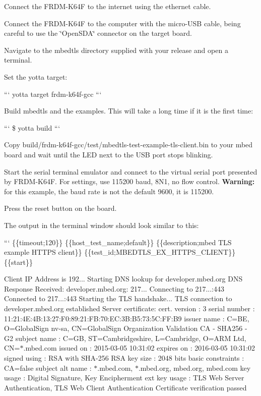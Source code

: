 \begin{DoxyEnumerate}
\item Connect the F\-R\-D\-M-\/\-K64\-F to the internet using the ethernet cable.
\item Connect the F\-R\-D\-M-\/\-K64\-F to the computer with the micro-\/\-U\-S\-B cable, being careful to use the \char`\"{}\-Open\-S\-D\-A\char`\"{} connector on the target board.
\item Navigate to the mbedtls directory supplied with your release and open a terminal.
\item Set the yotta target\-:

``` yotta target frdm-\/k64f-\/gcc ```
\item Build mbedtls and the examples. This will take a long time if it is the first time\-:

``` \$ yotta build ```
\item Copy {\ttfamily build/frdm-\/k64f-\/gcc/test/mbedtls-\/test-\/example-\/tls-\/client.\-bin} to your mbed board and wait until the L\-E\-D next to the U\-S\-B port stops blinking.
\item Start the serial terminal emulator and connect to the virtual serial port presented by F\-R\-D\-M-\/\-K64\-F. For settings, use 115200 baud, 8\-N1, no flow control. {\bfseries Warning\-:} for this example, the baud rate is not the default 9600, it is 115200.
\item Press the reset button on the board.
\item The output in the terminal window should look similar to this\-:

``` \{\{timeout;120\}\} \{\{host\-\_\-test\-\_\-name;default\}\} \{\{description;mbed T\-L\-S example H\-T\-T\-P\-S client\}\} \{\{test\-\_\-id;M\-B\-E\-D\-T\-L\-S\-\_\-\-E\-X\-\_\-\-H\-T\-T\-P\-S\-\_\-\-C\-L\-I\-E\-N\-T\}\} \{\{start\}\}

Client I\-P Address is 192... Starting D\-N\-S lookup for developer.\-mbed.\-org D\-N\-S Response Received\-: developer.\-mbed.\-org\-: 217... Connecting to 217...\-:443 Connected to 217...\-:443 Starting the T\-L\-S handshake... T\-L\-S connection to developer.\-mbed.\-org established Server certificate\-: cert. version \-: 3 serial number \-: 11\-:21\-:4\-E\-:4\-B\-:13\-:27\-:F0\-:89\-:21\-:F\-B\-:70\-:E\-C\-:3\-B\-:B5\-:73\-:5\-C\-:F\-F\-:B9 issuer name \-: C=B\-E, O=Global\-Sign nv-\/sa, C\-N=Global\-Sign Organization Validation C\-A -\/ S\-H\-A256 -\/ G2 subject name \-: C=G\-B, S\-T=Cambridgeshire, L=Cambridge, O=A\-R\-M Ltd, C\-N=$\ast$.mbed.\-com issued on \-: 2015-\/03-\/05 10\-:31\-:02 expires on \-: 2016-\/03-\/05 10\-:31\-:02 signed using \-: R\-S\-A with S\-H\-A-\/256 R\-S\-A key size \-: 2048 bits basic constraints \-: C\-A=false subject alt name \-: $\ast$.mbed.\-com, $\ast$.mbed.\-org, mbed.\-org, mbed.\-com key usage \-: Digital Signature, Key Encipherment ext key usage \-: T\-L\-S Web Server Authentication, T\-L\-S Web Client Authentication Certificate verification passed


\end{DoxyEnumerate}
